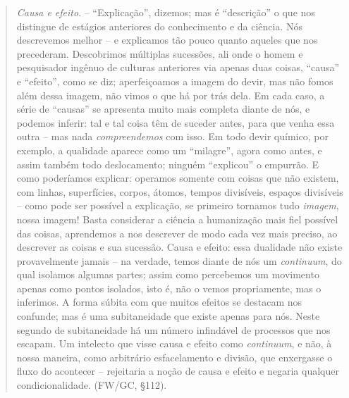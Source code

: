 \documentclass[
	12pt,				%
	openright,			%
	oneside,			%
	a4paper,			%
	english,			%
	french,				%
	spanish,			%
	brazil				%
	]{abntex2}
\begin{document}
\begin{quotation}
\textit{Causa e efeito}. – “Explicação”, dizemos; mas é “descrição” o que nos distingue de estágios anteriores do conhecimento e da ciência. Nós descrevemos melhor – e explicamos tão pouco quanto aqueles que nos precederam. Descobrimos múltiplas sucessões, ali onde o homem e pesquisador ingênuo de culturas anteriores via apenas duas coisas, “causa” e “efeito”, como se diz; aperfeiçoamos a imagem do devir, mas não fomos além dessa imagem, não vimos o que há por trás dela. Em cada caso, a série de “causas” se apresenta muito mais completa diante de nós, e podemos inferir: tal e tal coisa têm de suceder antes, para que venha essa outra – mas nada \textit{compreendemos} com isso. Em todo devir químico, por exemplo, a qualidade aparece como um “milagre”, agora como antes, e assim também todo deslocamento; ninguém “explicou” o empurrão. E como poderíamos explicar: operamos somente com coisas que não existem, com linhas, superfícies, corpos, átomos, tempos divisíveis, espaços divisíveis – como pode ser possível a explicação, se primeiro tornamos tudo \textit{imagem}, nossa imagem! Basta considerar a ciência a humanização mais fiel possível das coisas, aprendemos a nos descrever de modo cada vez mais preciso, ao descrever as coisas e sua sucessão. Causa e efeito: essa dualidade não existe provavelmente jamais – na verdade, temos diante de nós um \textit{continuum}, do qual isolamos algumas partes; assim como percebemos um movimento apenas como pontos isolados, isto é, não o vemos propriamente, mas o inferimos. A forma súbita com que muitos efeitos se destacam nos confunde; mas é uma subitaneidade que existe apenas para nós. Neste segundo de subitaneidade há um número infindável de processos que nos escapam. Um intelecto que visse causa e efeito como \textit{continuum}, e não, à nossa maneira, como arbitrário esfacelamento e divisão, que enxergasse o fluxo do acontecer – rejeitaria a noção de causa e efeito e negaria qualquer condicionalidade. (FW/GC, §112).
\end{quotation}
\end{document}
